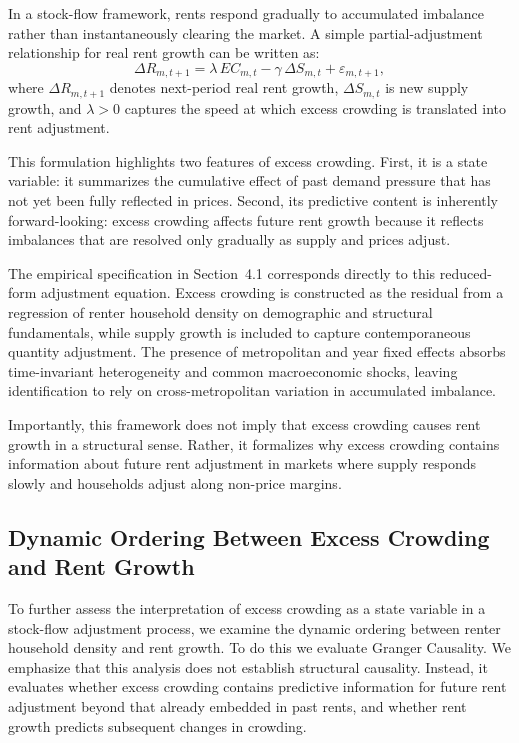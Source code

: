 \documentclass[pdflatex,sn-basic]{sn-jnl}%
\theoremstyle{thmstyleone}%
\theoremstyle{thmstyletwo}%
\theoremstyle{thmstylethree}%
\begin{document}
In a stock-flow framework, rents respond gradually to accumulated imbalance rather
than instantaneously clearing the market. A simple partial-adjustment relationship for
real rent growth can be written as:
\[
\Delta R_{m,t+1} = \lambda \, EC_{m,t} - \gamma \, \Delta S_{m,t} + \varepsilon_{m,t+1},
\]
where $\Delta R_{m,t+1}$ denotes next-period real rent growth, $\Delta S_{m,t}$ is
new supply growth, and $\lambda > 0$ captures the speed at which excess crowding is
translated into rent adjustment.

This formulation highlights two features of excess crowding. First, it is a
state variable: it summarizes the cumulative effect of past demand pressure that has
not yet been fully reflected in prices. Second, its predictive content is inherently
forward-looking: excess crowding affects future rent growth because it reflects
imbalances that are resolved only gradually as supply and prices adjust.

The empirical specification in Section~4.1 corresponds directly to this reduced-form
adjustment equation. Excess crowding is constructed as the residual from a regression
of renter household density on demographic and structural fundamentals, while supply
growth is included to capture contemporaneous quantity adjustment. The presence of
metropolitan and year fixed effects absorbs time-invariant heterogeneity and common
macroeconomic shocks, leaving identification to rely on cross-metropolitan variation
in accumulated imbalance.

Importantly, this framework does not imply that excess crowding causes rent growth in
a structural sense. Rather, it formalizes why excess crowding contains information
about future rent adjustment in markets where supply responds slowly and households
adjust along non-price margins.
\subsection{Dynamic Ordering Between Excess Crowding and Rent Growth}

To further assess the interpretation of excess crowding as a state variable in a
stock-flow adjustment process, we examine the dynamic ordering between renter
household density and rent growth. To do this we evaluate Granger Causality. We emphasize that this analysis does not establish
structural causality. Instead, it evaluates whether excess crowding contains predictive
information for future rent adjustment beyond that already embedded in past rents, and
whether rent growth predicts subsequent changes in crowding.
\end{document}
